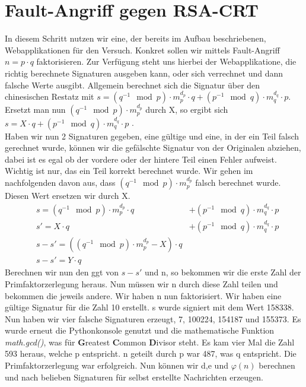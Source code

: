 \documentclass{article}
\begin{document}
\section{Fault-Angriff gegen RSA-CRT}
In diesem Schritt nutzen wir eine, der bereits im Aufbau beschriebenen, Webapplikationen für den Versuch. Konkret sollen wir mittels Fault-Angriff $n=p \cdot q$ faktorisieren. Zur Verfügung steht uns hierbei der Webapplikatione, die richtig berechnete Signaturen ausgeben kann, oder sich verrechnet und dann falsche Werte ausgibt. Allgemein berechnet sich die Signatur über den chinesischen Restatz mit $s = (q^{-1}\mod{p}) \cdot m_p^{d_p}\cdot q + (p^{-1}\mod{q}) \cdot m_q^{d_q}\cdot p$. Ersetzt man nun $(q^{-1}\mod{p})\cdot m_p^{d_p}$ durch X, so ergibt sich $s = X\cdot q + (p^{-1}\mod{q}) \cdot m_q^{d_q}\cdot p$ .\\
Haben wir nun 2 Signaturen gegeben, eine gültige und eine, in der ein Teil falsch gerechnet wurde, können wir die gefälschte Signatur von der Originalen abziehen, dabei ist es egal ob der vordere oder der hintere Teil einen Fehler aufweist. Wichtig ist nur, das ein Teil korrekt berechnet wurde. Wir gehen im nachfolgenden davon aus, dass $(q^{-1}\mod{p})\cdot m_p^{d_p}$ falsch berechnet wurde. Diesen Wert ersetzen wir durch X.
\begin{align}
&s = (q^{-1}\mod{p}) \cdot m_p^{d_p}\cdot q &+ (p^{-1}\mod{q}) \cdot m_q^{d_q}\cdot p \\
&s' = X\cdot q &+ (p^{-1}\mod{q}) \cdot m_q^{d_q}\cdot p \\
&s-s' = ((q^{-1}\mod{p}) \cdot m_p^{d_p}-X)\cdot q \\
&s-s' = Y \cdot q 
\end{align}
Berechnen wir nun den ggt von $s-s'$ und n, so bekommen wir die erste Zahl der Primfaktorzerlegung heraus. Nun müssen wir n durch diese Zahl teilen und bekommen die jeweils andere. Wir haben n nun faktorisiert. Wir haben eine gültige Signatur für die Zahl 10 erstellt. s wurde signiert mit dem Wert 158338. Nun haben wir vier falsche Signaturen erzeugt, 7, 100224, 154187 und 155373. Es wurde erneut die Pythonkonsole genutzt und die mathematische Funktion \textit{math.gcd()}, was für \textbf{G}reatest \textbf{C}ommon \textbf{D}ivisor steht. Es kam vier Mal die Zahl 593 heraus, welche p entspricht. n geteilt durch p war 487, was q entspricht. Die Primfaktorzerlegung war erfolgreich. Nun können wir d,e und $\varphi(n)$ berechnen und nach belieben Signaturen für selbst erstellte Nachrichten erzeugen.
\newpage
\end{document}

